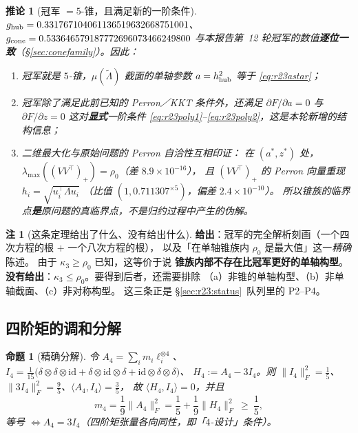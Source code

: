 \documentclass[UTF8,11pt]{ctexart}
\newtheorem{proposition}[theorem]{命题}
\newtheorem{corollary}[theorem]{推论}
\theoremstyle{definition}
\newtheorem{remark}[theorem]{注}
\newcommand{\Lam}{\Lambda}
\begin{document}
\begin{corollary}[冠军 $=5$-锥，且满足新的一阶条件]\label{cor:r23champ}
$g_{\rm hub}=0.331767104061136519632668751001$、$g_{\rm cone}=0.533646579187772696073466249800$
与本报告第~12 轮冠军的数值\textbf{逐位一致}（\S\ref{sec:conefamily}）。因此：
\begin{enumerate}\itemsep2pt
\item 冠军就是 $5$-锥，$\mu(\tilde\Lam)$ 截面的单轴参数 $a=h_{\rm hub}^2$ 等于 \eqref{eq:r23astar}；
\item 冠军除了满足此前已知的 Perron／KKT 条件外，还满足
$\partial F/\partial a=0$ 与 $\partial F/\partial z=0$ 这对\textbf{显式}一阶条件
\eqref{eq:r23poly1}--\eqref{eq:r23poly2}，这是本轮新增的结构信息；
\item 二维最大化与原始问题的 Perron 自洽性互相印证：
在 $(a^*,z^*)$ 处，$\lambda_{\max}((VV^\top)_+)=\rho_0$（差 $8.9\times10^{-16}$），
且 $(VV^\top)_+$ 的 Perron 向量重现 $h_i=\sqrt{u_i^\top\Lam u_i}$
（比值 $(1,0.711307^{\times5})$，偏差 $2.4\times10^{-10}$）。
所以锥族的临界点\textbf{是}原问题的真临界点，不是归约过程中产生的伪解。
\end{enumerate}
\end{corollary}

\begin{remark}[这条定理给出了什么、没有给出什么]\label{rem:r23what}
\textbf{给出}：冠军的完全解析刻画（一个四次方程的根 $+$ 一个八次方程的根），
以及「在单轴锥族内 $\rho_0$ 是最大值」这一\emph{精确}陈述。
由于 $\kappa_3\ge\rho_0$ 已知，这等价于说
\textbf{锥族内部不存在比冠军更好的单轴构型}。
\textbf{没有给出}：$\kappa_3\le\rho_0$。要得到后者，还需要排除
（a）非锥的单轴构型、（b）非单轴截面、（c）非对称构型。
这三条正是 \S\ref{sec:r23:status}~队列里的 P2--P4。
\end{remark}

\subsection{四阶矩的调和分解}\label{sec:r23:harm}

\begin{proposition}[精确分解]\label{prop:r23harm}
令 $A_4=\sum_im_i\ell_i^{\otimes4}$、
$I_4=\frac1{15}\bigl(\delta\otimes\delta\otimes\mathrm{id}+\delta\otimes\mathrm{id}\otimes\delta+\mathrm{id}\otimes\delta\otimes\delta\bigr)$、
$H_4:=A_4-3I_4$。则 $\|I_4\|_F^2=\frac15$、$\|3I_4\|_F^2=\frac95$、$\langle A_4,I_4\rangle=\frac35$，
故 $\langle H_4,I_4\rangle=0$，并且
\begin{equation}\label{eq:r23harm}
m_4=\frac19\|A_4\|_F^2=\frac15+\frac19\|H_4\|_F^2\ \ge\ \frac15 ,
\end{equation}
等号 $\iff A_4=3I_4$（四阶矩张量各向同性，即「$4$-设计」条件）。
\end{proposition}
\end{document}
